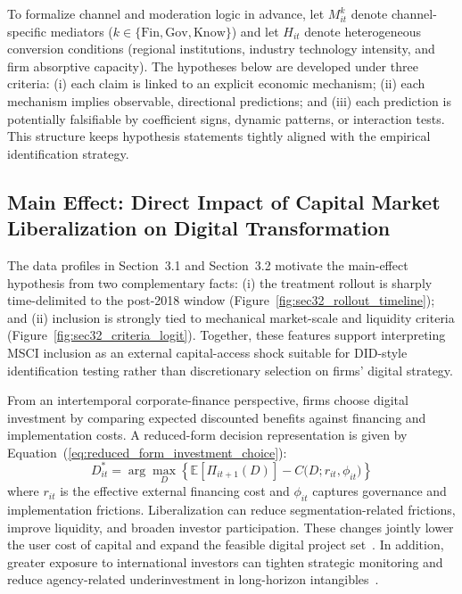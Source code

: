 To formalize channel and moderation logic in advance, let $M^{k}_{it}$ denote channel-specific mediators ($k \in \{\mathrm{Fin},\mathrm{Gov},\mathrm{Know}\}$) and let $H_{it}$ denote heterogeneous conversion conditions (regional institutions, industry technology intensity, and firm absorptive capacity). The hypotheses below are developed under three criteria: (i) each claim is linked to an explicit economic mechanism; (ii) each mechanism implies observable, directional predictions; and (iii) each prediction is potentially falsifiable by coefficient signs, dynamic patterns, or interaction tests. This structure keeps hypothesis statements tightly aligned with the empirical identification strategy.

\subsection{Main Effect: Direct Impact of Capital Market Liberalization on Digital Transformation}

The data profiles in Section~3.1 and Section~3.2 motivate the main-effect hypothesis from two complementary facts: (i) the treatment rollout is sharply time-delimited to the post-2018 window (Figure~\ref{fig:sec32_rollout_timeline}); and (ii) inclusion is strongly tied to mechanical market-scale and liquidity criteria (Figure~\ref{fig:sec32_criteria_logit}). Together, these features support interpreting MSCI inclusion as an external capital-access shock suitable for DID-style identification testing rather than discretionary selection on firms' digital strategy.

From an intertemporal corporate-finance perspective, firms choose digital investment by comparing expected discounted benefits against financing and implementation costs. A reduced-form decision representation is given by Equation~(\ref{eq:reduced_form_investment_choice}):
\begin{equation}
\label{eq:reduced_form_investment_choice}
D^*_{it} = \arg\max_D \left\{\mathbb{E}[\Pi_{it+1}(D)] - C\big(D; r_{it}, \phi_{it}\big)\right\}
\end{equation}
where $r_{it}$ is the effective external financing cost and $\phi_{it}$ captures governance and implementation frictions. Liberalization can reduce segmentation-related frictions, improve liquidity, and broaden investor participation. These changes jointly lower the user cost of capital and expand the feasible digital project set~\cite{Long2024,Zhu2023,Yin2023,HLiu2024}. In addition, greater exposure to international investors can tighten strategic monitoring and reduce agency-related underinvestment in long-horizon intangibles~\cite{Chen2025,Stiglitz2004,ChengMasron2023}.


